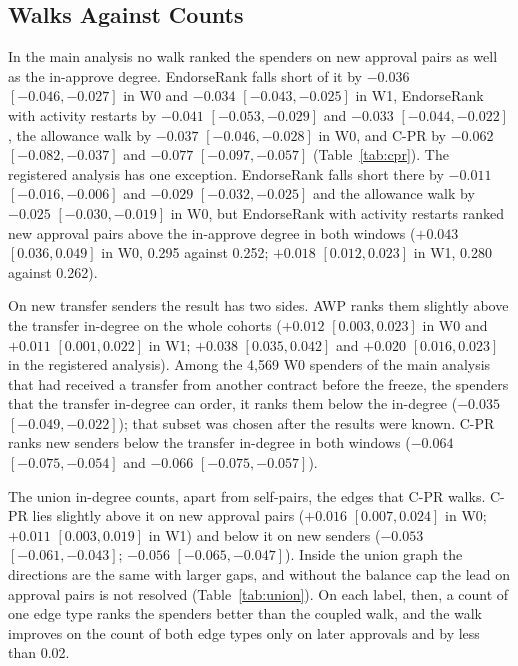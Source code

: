\documentclass{ieeeaccess}
\newcommand{\cpr}{\mbox{C-PR}}
\begin{document}
\subsection{Walks Against Counts}
\label{sec:counts}
In the main analysis no walk ranked the spenders on new approval pairs as well as the in-approve degree. EndorseRank falls short of it by $-0.036$ $[-0.046,-0.027]$ in W0 and $-0.034$ $[-0.043,-0.025]$ in W1, EndorseRank with activity restarts by $-0.041$ $[-0.053,-0.029]$ and $-0.033$ $[-0.044,-0.022]$, the allowance walk by $-0.037$ $[-0.046,-0.028]$ in W0, and \cpr{} by $-0.062$ $[-0.082,-0.037]$ and $-0.077$ $[-0.097,-0.057]$ (Table~\ref{tab:cpr}). The registered analysis has one exception. EndorseRank falls short there by $-0.011$ $[-0.016,-0.006]$ and $-0.029$ $[-0.032,-0.025]$ and the allowance walk by $-0.025$ $[-0.030,-0.019]$ in W0, but EndorseRank with activity restarts ranked new approval pairs above the in-approve degree in both windows ($+0.043$ $[0.036,0.049]$ in W0, 0.295 against 0.252; $+0.018$ $[0.012,0.023]$ in W1, 0.280 against 0.262).

On new transfer senders the result has two sides. AWP ranks them slightly above the transfer in-degree on the whole cohorts ($+0.012$ $[0.003,0.023]$ in W0 and $+0.011$ $[0.001,0.022]$ in W1; $+0.038$ $[0.035,0.042]$ and $+0.020$ $[0.016,0.023]$ in the registered analysis). Among the 4,569 W0 spenders of the main analysis that had received a transfer from another contract before the freeze, the spenders that the transfer in-degree can order, it ranks them below the in-degree ($-0.035$ $[-0.049,-0.022]$); that subset was chosen after the results were known. \cpr{} ranks new senders below the transfer in-degree in both windows ($-0.064$ $[-0.075,-0.054]$ and $-0.066$ $[-0.075,-0.057]$).

The union in-degree counts, apart from self-pairs, the edges that \cpr{} walks. \cpr{} lies slightly above it on new approval pairs ($+0.016$ $[0.007,0.024]$ in W0; $+0.011$ $[0.003,0.019]$ in W1) and below it on new senders ($-0.053$ $[-0.061,-0.043]$; $-0.056$ $[-0.065,-0.047]$). Inside the union graph the directions are the same with larger gaps, and without the balance cap the lead on approval pairs is not resolved (Table~\ref{tab:union}). On each label, then, a count of one edge type ranks the spenders better than the coupled walk, and the walk improves on the count of both edge types only on later approvals and by less than 0.02.
\end{document}
